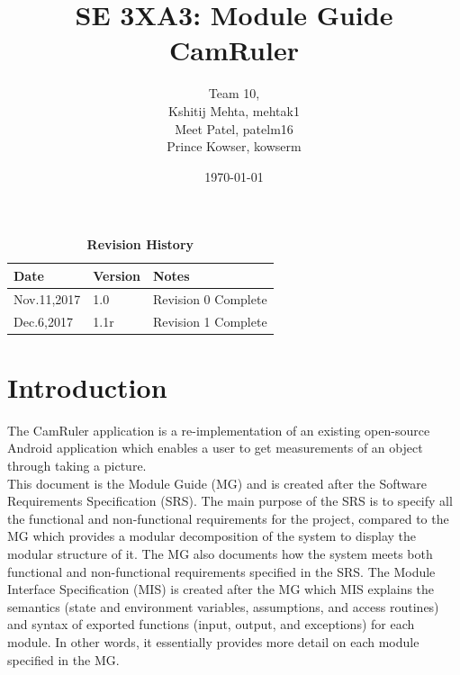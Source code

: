 \documentclass[12pt, titlepage]{article}
\title{SE 3XA3: Module Guide\\CamRuler}
\author{Team 10,
		\\ Kshitij Mehta, mehtak1
		\\ Meet Patel, patelm16
		\\ Prince Kowser, kowserm
}
\date{\today}
\begin{document}
\maketitle

\tableofcontents
\listoftables
\listoffigures


\begin{table}
\caption{\bf Revision History}
\begin{tabularx}{\textwidth}{p{3cm}p{2cm}X}
\toprule {\bf Date} & {\bf Version} & {\bf Notes}\\
\midrule
Nov.11,2017 & 1.0  & Revision 0 Complete \\
\midrule
Dec.6,2017 & 1.1r & Revision 1 Complete \\
\bottomrule
\end{tabularx}
\end{table}

\newpage


\section{Introduction}


The CamRuler application is a re-implementation of an existing open-source Android application which enables a user to get measurements of an object through taking a picture. 
\\

\noindent This document is the Module Guide (MG) and is created after the Software Requirements Specification (SRS). The main purpose of the SRS is to specify all the functional and non-functional requirements for the project, compared to the MG which provides a modular decomposition of the system to display the modular structure of it. The MG also documents how the system meets both functional and non-functional requirements specified in the SRS. The Module Interface Specification (MIS) is created after the MG which MIS explains the semantics (state and environment variables, assumptions, and access routines) and syntax of exported functions (input, output, and exceptions) for each module. In other words, it essentially provides more detail on each module specified in the MG.
\\
\end{document}
